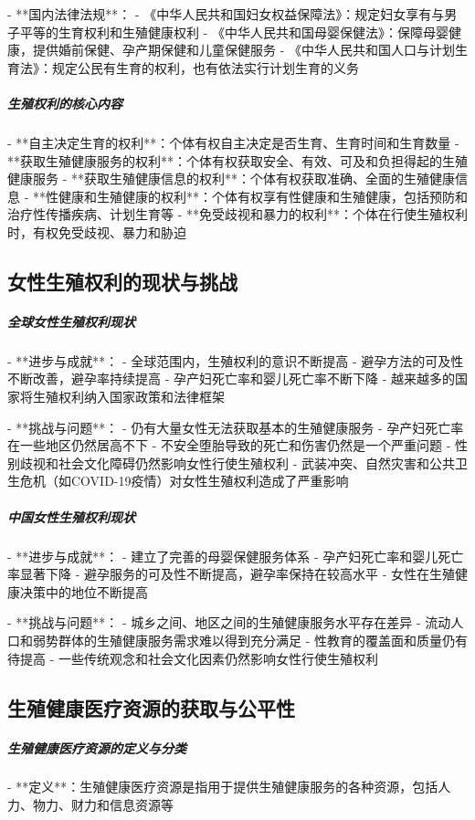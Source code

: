 \begin{enumerate}
- **国内法律法规**：
  - 《中华人民共和国妇女权益保障法》：规定妇女享有与男子平等的生育权利和生殖健康权利
  - 《中华人民共和国母婴保健法》：保障母婴健康，提供婚前保健、孕产期保健和儿童保健服务
  - 《中华人民共和国人口与计划生育法》：规定公民有生育的权利，也有依法实行计划生育的义务

\subparagraph{生殖权利的核心内容}

- **自主决定生育的权利**：个体有权自主决定是否生育、生育时间和生育数量
- **获取生殖健康服务的权利**：个体有权获取安全、有效、可及和负担得起的生殖健康服务
- **获取生殖健康信息的权利**：个体有权获取准确、全面的生殖健康信息
- **性健康和生殖健康的权利**：个体有权享有性健康和生殖健康，包括预防和治疗性传播疾病、计划生育等
- **免受歧视和暴力的权利**：个体在行使生殖权利时，有权免受歧视、暴力和胁迫

\subsection{女性生殖权利的现状与挑战}

\subparagraph{全球女性生殖权利现状}

- **进步与成就**：
  - 全球范围内，生殖权利的意识不断提高
  - 避孕方法的可及性不断改善，避孕率持续提高
  - 孕产妇死亡率和婴儿死亡率不断下降
  - 越来越多的国家将生殖权利纳入国家政策和法律框架

- **挑战与问题**：
  - 仍有大量女性无法获取基本的生殖健康服务
  - 孕产妇死亡率在一些地区仍然居高不下
  - 不安全堕胎导致的死亡和伤害仍然是一个严重问题
  - 性别歧视和社会文化障碍仍然影响女性行使生殖权利
  - 武装冲突、自然灾害和公共卫生危机（如COVID-19疫情）对女性生殖权利造成了严重影响

\subparagraph{中国女性生殖权利现状}

- **进步与成就**：
  - 建立了完善的母婴保健服务体系
  - 孕产妇死亡率和婴儿死亡率显著下降
  - 避孕服务的可及性不断提高，避孕率保持在较高水平
  - 女性在生殖健康决策中的地位不断提高

- **挑战与问题**：
  - 城乡之间、地区之间的生殖健康服务水平存在差异
  - 流动人口和弱势群体的生殖健康服务需求难以得到充分满足
  - 性教育的覆盖面和质量仍有待提高
  - 一些传统观念和社会文化因素仍然影响女性行使生殖权利

\subsection{生殖健康医疗资源的获取与公平性}

\subparagraph{生殖健康医疗资源的定义与分类}

- **定义**：生殖健康医疗资源是指用于提供生殖健康服务的各种资源，包括人力、物力、财力和信息资源等


\end{enumerate}
